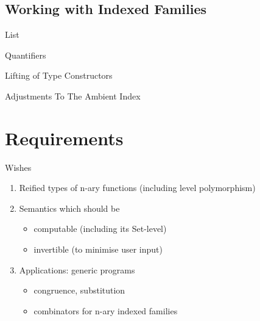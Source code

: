 \documentclass[compress,9pt]{beamer}
\begin{document}
\subsection{Working with Indexed Families}

\begin{frame}{List}
\end{frame}

\begin{frame}{Quantifiers}
\end{frame}

\begin{frame}{Lifting of Type Constructors}
\end{frame}

\begin{frame}{Adjustments To The Ambient Index}
\end{frame}

\section{Requirements}


\begin{frame}{Wishes}

  \begin{enumerate}
    \item Reified types of n-ary functions (including level polymorphism)
    \bigskip
    \item Semantics which should be
      \begin{itemize}
        \item computable (including its Set-level)
        \item invertible (to minimise user input)
      \end{itemize}
    \bigskip
    \item Applications: generic programs
      \begin{itemize}
        \item congruence, substitution
        \item combinators for n-ary indexed families
      \end{itemize}
    \end{enumerate}

\end{frame}
\end{document}
